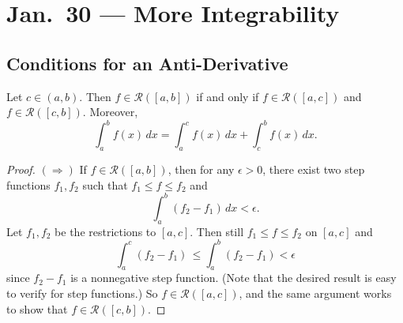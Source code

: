 \chapter{Jan.~30 --- More Integrability}

\section{Conditions for an Anti-Derivative}
\begin{lemma}
  \label{lem:split-integral}
  Let $c \in (a, b)$. Then $f \in \mathcal{R}([a, b])$ if and only if $f \in \mathcal{R}([a, c])$ and $f \in \mathcal{R}([c, b])$. Moreover,
  \[
    \int_a^b f(x) \, dx = \int_a^c f(x) \, dx + \int_c^b f(x) \, dx. \tag{$*$}
  \]
\end{lemma}

\begin{proof}
  $(\Rightarrow)$ If $f \in \mathcal{R}([a, b])$, then
  for any $\epsilon > 0$, there exist two step
  functions $f_1, f_2$ such that $f_1 \le f \le f_2$
  and
  \[
    \int_a^b (f_2 - f_1) \, dx < \epsilon.
  \]
  Let $f_1, f_2$ be the restrictions to $[a, c]$.
  Then still $f_1 \le f \le f_2$ on $[a, c]$ and
  \[
    \int_a^c (f_2 - f_1)\, \le
    \int_a^b (f_2 - f_1) < \epsilon
  \]
  since $f_2 - f_1$ is a nonnegative step function. (Note
  that the desired result is easy to verify for step
  functions.)
  So $f \in \mathcal{R}([a, c])$, and the same
  argument works to show that $f \in \mathcal{R}([c, b])$.


\end{proof}
